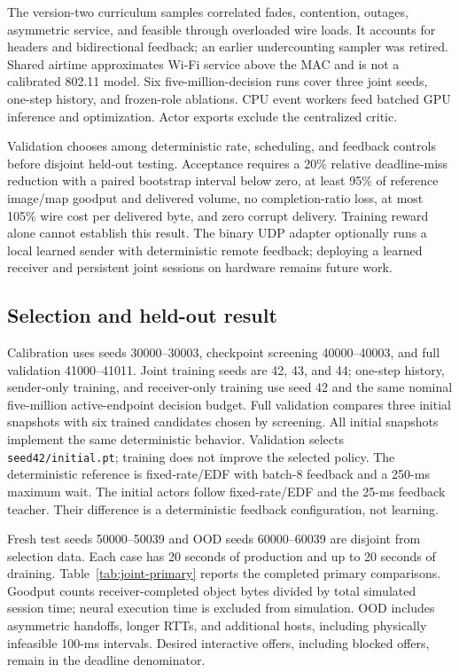 \documentclass[11pt]{article}
\begin{document}
The version-two curriculum samples correlated fades, contention, outages,
asymmetric service, and feasible through overloaded wire loads. It accounts for
headers and bidirectional feedback; an earlier undercounting sampler was retired.
Shared airtime approximates Wi-Fi service above the MAC and is not a calibrated
802.11 model. Six five-million-decision runs cover three joint seeds, one-step
history, and frozen-role ablations. CPU event workers feed batched GPU inference
and optimization. Actor exports exclude the centralized critic.

Validation chooses among deterministic rate, scheduling, and feedback controls
before disjoint held-out testing. Acceptance requires a 20\% relative deadline-miss
reduction with a paired bootstrap interval below zero, at least 95\% of reference
image/map goodput and delivered volume, no completion-ratio loss, at most 105\%
wire cost per delivered byte, and zero corrupt delivery. Training reward alone
cannot establish this result. The binary UDP adapter optionally runs a local
learned sender with deterministic remote feedback; deploying a learned receiver
and persistent joint sessions on hardware remains future work.

\subsection{Selection and held-out result}
Calibration uses seeds 30000--30003, checkpoint screening 40000--40003, and full
validation 41000--41011. Joint training seeds are 42, 43, and 44; one-step history,
sender-only training, and receiver-only training use seed 42 and the same nominal
five-million active-endpoint decision budget. Full validation compares three initial snapshots with six trained candidates
chosen by screening.
All initial snapshots implement the same deterministic behavior. Validation
selects \texttt{seed42/initial.pt}; training does not improve the selected policy.
The deterministic reference is fixed-rate/EDF with batch-8 feedback and a 250-ms
maximum wait. The initial actors follow fixed-rate/EDF and the 25-ms feedback
teacher. Their difference is a deterministic feedback configuration, not learning.

Fresh test seeds 50000--50039 and OOD seeds 60000--60039 are disjoint from
selection data. Each case has 20 seconds of production and up to 20 seconds of
draining. Table~\ref{tab:joint-primary} reports the completed primary comparisons.
Goodput counts receiver-completed object bytes divided by total simulated session
time; neural execution time is excluded from simulation. OOD includes asymmetric
handoffs, longer RTTs, and additional hosts, including physically infeasible
100-ms intervals. Desired interactive offers, including blocked offers, remain
in the deadline denominator.
\end{document}
